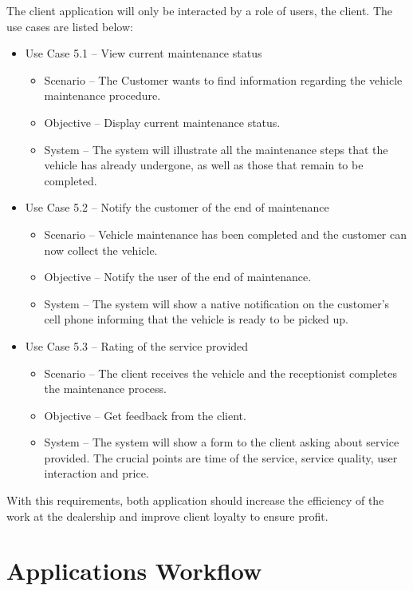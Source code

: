 The client application will only be interacted by a role of users, the client.
The use cases are listed below:

\begin{itemize}
  \item Use Case 5.1 – View current maintenance status
  \begin{itemize}
    \item Scenario – The Customer wants to find information regarding the vehicle maintenance procedure.
    \item Objective – Display current maintenance status.
    \item System – The system will illustrate all the maintenance steps that the vehicle has already undergone, as well as those that remain to be completed. 
  \end{itemize}
  \item Use Case 5.2 – Notify the customer of the end of maintenance 
  \begin{itemize}
    \item Scenario – Vehicle maintenance has been completed and the customer can now collect the vehicle.
    \item Objective – Notify the user of the end of maintenance.
    \item System – The system will show a native notification on the customer's cell phone informing that the vehicle is ready to be picked up. 
  \end{itemize}
  \item Use Case 5.3 – Rating of the service provided
  \begin{itemize}
    \item Scenario – The client receives the vehicle and the receptionist completes the maintenance process.
    \item Objective – Get feedback from the client.
    \item System – The system will show a form to the client asking about service provided. The crucial points are time of the service, service quality, user interaction and price.
  \end{itemize}
\end{itemize}
\hfill \break

With this requirements, both application should increase the efficiency of the work at the dealership and improve client loyalty to ensure profit.


\section{Applications Workflow}

